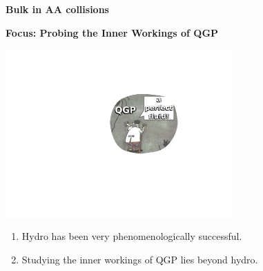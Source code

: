 \documentclass[9pt,a4paper,unknownkeysallowed,xcolor=dvipsnames,aspectratio=43]{beamer}
\begin{document}
%
%
\setcounter{page}{0}
\begin{frame}
\vspace*{\fill}
\begin{center}
{\Huge\bf\color{gray} Bulk in AA collisions}
\end{center}
\vspace*{\fill}
\end{frame}
%
%
\begin{frame}{\bf\huge Focus: Probing the Inner Workings of QGP}	\vspace{4mm}
\begin{center}
\includegraphics[width=0.65\textwidth]{fig/elephant}
\vspace{4mm}
\begin{enumerate}
\item {Hydro has been very phenomenologically successful.}
\vspace{4mm}
\item {\color{white} Studying the inner workings of QGP lies beyond hydro.}
\end{enumerate}
\end{center}
\end{frame}
%
%
\end{document}
